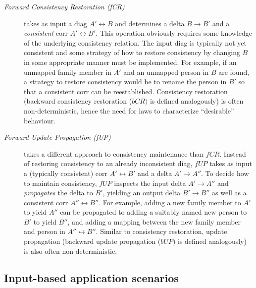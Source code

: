\begin{description}
\item[\emph{Forward Consistency Restoration (fCR)}] takes as input a diag $A' \leftrightarrow B$ and determines a delta $B \rightarrow B'$ and a \emph{consistent} corr $A' \leftrightarrow B'$.
This operation obviously requires some knowledge of the underlying consistency relation.
The input diag is typically not yet consistent and some strategy of how to restore consistency by changing $B$ in some appropriate manner must be implemented.
For example, if an unmapped family member in $A'$ and an unmapped person in $B$ are found, a strategy to restore consistency would be to rename the person in $B'$ so that a consistent corr can be reestablished.
Consistency restoration (backward consistency restoration ($\mathit{bCR})$ is defined analogously) is often non-deterministic, hence the need for laws to characterize ``desirable'' behaviour.

\item[\emph{Forward Update Propagation (fUP)}] takes a different approach to consistency maintenance than $\mathit{fCR}$.
Instead of restoring consistency to an already inconsistent diag, $\mathit{fUP}$ takes as input a (typically consistent) corr $A' \leftrightarrow B'$ and a delta $A' \rightarrow A''$.
To decide how to maintain consistency, $\mathit{fUP}$ inspects the input delta $A' \rightarrow A''$ and \emph{propagates} the delta to $B'$, yielding an output delta $B' \rightarrow B''$ as well as a consistent corr $A'' \leftrightarrow B''$.
For example, adding a new family member to $A'$ to yield $A''$ can be propagated to adding a suitably named new person to $B'$ to yield $B''$, and adding a mapping between the new family member and person in $A'' \leftrightarrow B''$.  
Similar to consistency restoration, update propagation (backward update propagation ($\mathit{bUP})$ is defined analogously) is also often non-deterministic.
\end{description}

\subsection{Input-based application scenarios}
\label{sec:application-scenarios}

